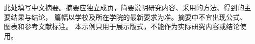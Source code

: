 \begin{cnabstract}
此处填写中文摘要。摘要应独立成页，简要说明研究内容、采用的方法、得到的主要结果与结论，
篇幅以学校及所在学院的最新要求为准。摘要中不宜出现公式、图表和参考文献标注。
本示例只用于展示版式，不能作为实际研究内容或结论使用。

\end{cnabstract}
